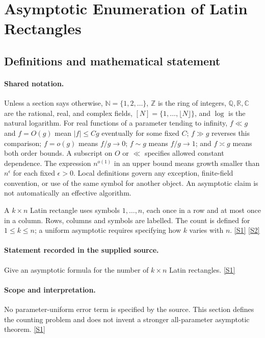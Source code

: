 \documentclass[11pt,a4paper]{article}
\newcommand{\N}{\mathbb{N}}
\newcommand{\Z}{\mathbb{Z}}
\newcommand{\Q}{\mathbb{Q}}
\newcommand{\R}{\mathbb{R}}
\newcommand{\C}{\mathbb{C}}
\newcommand{\sref}[2]{\hyperlink{source:#1:#2}{[S#2]}}
\begin{document}
\section{Asymptotic Enumeration of Latin Rectangles}\label{statement}


\subsection{Definitions and mathematical statement}

\paragraph{Shared notation.}Unless a section says otherwise, $\N=\{1,2,\ldots\}$,
$\Z$ is the ring of integers, $\Q,\R,\C$ are the rational, real, and complex
fields, $[N]=\{1,\ldots,\lfloor N\rfloor\}$, and $\log$ is the natural
logarithm. For real functions of a parameter tending to infinity,
$f\ll g$ and $f=O(g)$ mean $|f|\leq Cg$ eventually for some fixed $C$;
$f\gg g$ reverses this comparison; $f=o(g)$ means $f/g\to0$;
$f\sim g$ means $f/g\to1$; and $f\asymp g$ means both order bounds.
A subscript on $O$ or $\ll$ specifies allowed constant dependence.
The expression $n^{o(1)}$ in an upper bound means growth smaller than
$n^\epsilon$ for each fixed $\epsilon>0$. Local definitions govern any
exception, finite-field convention, or use of the same symbol for another
object. An asymptotic claim is not automatically an effective algorithm.



A $k\times n$ Latin rectangle uses symbols $1,\ldots,n$, each once in a row and at most once in a column. Rows, columns and symbols are labelled. The count is defined for $1\leq k\leq n$; a uniform asymptotic requires specifying how $k$ varies with $n$. \sref{statement}{1} \sref{statement}{2}

\paragraph{Statement recorded in the supplied source.}
Give an asymptotic formula for the number of $k\times n$ Latin rectangles. \sref{statement}{1}

\paragraph{Scope and interpretation.}

No parameter-uniform error term is specified by the source. This section defines the counting problem and does not invent a stronger all-parameter asymptotic theorem. \sref{statement}{1}
\end{document}
